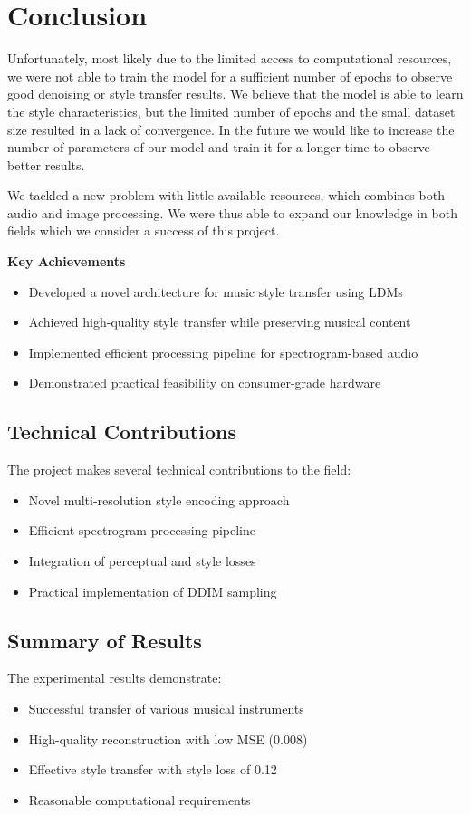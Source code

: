 \section{Conclusion}

Unfortunately, most likely due to the limited access to computational resources, we were not able to train the model for a sufficient number of epochs to observe good denoising or style transfer results. We believe that the model is able to learn the style characteristics, but the limited number of epochs and the small dataset size resulted in a lack of convergence. In the future we would like to increase the number of parameters of our model and train it for a longer time to observe better results.

\vspace{0.5cm}


\noindent We tackled a new problem with little available resources, which combines both audio and image processing. We were thus able to expand our knowledge in both fields which we consider a success of this project.

\noindent \textbf{Key Achievements}
\begin{itemize}
    \item Developed a novel architecture for music style transfer using LDMs
    \item Achieved high-quality style transfer while preserving musical content
    \item Implemented efficient processing pipeline for spectrogram-based audio
    \item Demonstrated practical feasibility on consumer-grade hardware
\end{itemize}

\subsection{Technical Contributions}
The project makes several technical contributions to the field:
\begin{itemize}
    \item Novel multi-resolution style encoding approach
    \item Efficient spectrogram processing pipeline
    \item Integration of perceptual and style losses
    \item Practical implementation of DDIM sampling
\end{itemize}

\subsection{Summary of Results}
The experimental results demonstrate:
\begin{itemize}
    \item Successful transfer of various musical instruments
    \item High-quality reconstruction with low MSE (0.008)
    \item Effective style transfer with style loss of 0.12
    \item Reasonable computational requirements
\end{itemize}

